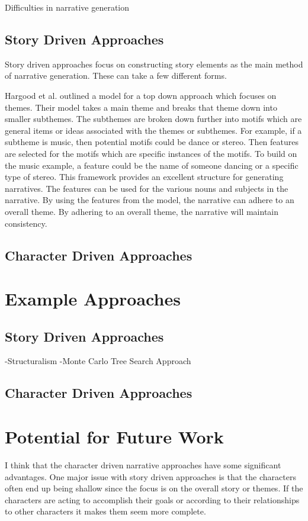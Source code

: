 \documentclass[]{article}
\begin{document}
Difficulties in narrative generation

\subsection{Story Driven Approaches}

Story driven approaches focus on constructing story elements as the main method of narrative generation. These can take a few different forms. 

Hargood et al. outlined a model for a top down approach which focuses on themes\cite{ThematicEmerge}. Their model takes a main theme and breaks that theme down into smaller subthemes. The subthemes are broken down further into motifs which are general items or ideas associated with the themes or subthemes. For example, if a subtheme is music, then potential motifs could be dance or stereo. Then features are selected for the motifs which are specific instances of the motifs. To build on the music example, a feature could be the name of someone dancing or a specific type of stereo. This framework provides an excellent structure for generating narratives. The features can be used for the various nouns and subjects in the narrative. By using the features from the model, the narrative can adhere to an overall theme. By adhering to an overall theme, the narrative will maintain consistency.

\subsection{Character Driven Approaches}

\section{Example Approaches}

\subsection{Story Driven Approaches}
-Structuralism
-Monte Carlo Tree Search Approach

\subsection{Character Driven Approaches}

\section{Potential for Future Work}
I think that the character driven narrative approaches have some significant advantages. One major issue with story driven approaches is that the characters often end up being shallow since the focus is on the overall story or themes. If the characters are acting to accomplish their goals or according to their relationships to other characters it makes them seem more complete.
\end{document}
